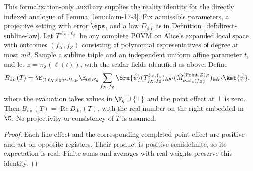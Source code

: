 \begin{theorem}
	\label{thm:subline-z-overlap-real-direct}
	\leanok
	This formalization-only auxiliary supplies the reality identity for the
	directly indexed analogue of Lemma~\ref{lem:claim-17-3}. Fix admissible
	parameters, a projective setting with error $\eps$, and a law
	$D_{\mathrm{dir}}$ as in Definition~\ref{def:direct-subline-law}.
	Let $T^{\ell_X,\ell_Z}$ be any complete POVM on Alice's expanded local
	space with outcomes $(f_X,f_Z)$ consisting of polynomial representatives
	of degree at most $md$. Sample a subline triple and an independent uniform
	affine parameter $t$, and let $z=\pi_Z(\ell(t))$, with the scalar fields
	identified as above. Define
	\[
		B_{\mathrm{dir}}(T)=
		\E_{(\ell,\ell_X,\ell_Z)\sim D_{\mathrm{dir}}}\E_{t\in\F_q}
		\sum_{f_X,f_Z}\bra{\hat\psi}
		(T^{\ell_X,\ell_Z}_{f_X,f_Z})_{\mathsf{A}\mathsf{A}'}
		(\hat M^{(\mathrm{Point},Z),z}_{\mathrm{eval}_z(f_Z)})_{
		\mathsf{B}\mathsf{A}''}\ket{\hat\psi},
	\]
	where the evaluation takes values in $\F_q\cup\{\bot\}$ and the point
	effect at $\bot$ is zero. Then
	$B_{\mathrm{dir}}(T)=\operatorname{Re}B_{\mathrm{dir}}(T)$, with the
	real number on the right embedded in $\C$. No projectivity or consistency
	of $T$ is assumed.
\end{theorem}
\begin{proof}
	\leanok
	Each line effect and the corresponding completed point effect are positive
	and act on opposite registers. Their product is positive semidefinite, so
	its expectation is real. Finite sums and averages with real weights
	preserve this identity.
\end{proof}

